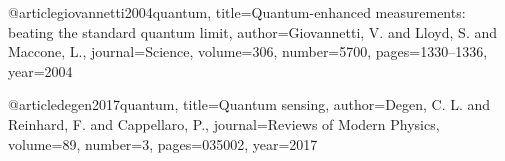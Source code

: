 @article{giovannetti2004quantum,
  title={Quantum-enhanced measurements: beating the standard quantum limit},
  author={Giovannetti, V. and Lloyd, S. and Maccone, L.},
  journal={Science},
  volume={306},
  number={5700},
  pages={1330--1336},
  year={2004}
}

@article{degen2017quantum,
  title={Quantum sensing},
  author={Degen, C. L. and Reinhard, F. and Cappellaro, P.},
  journal={Reviews of Modern Physics},
  volume={89},
  number={3},
  pages={035002},
  year={2017}
}
